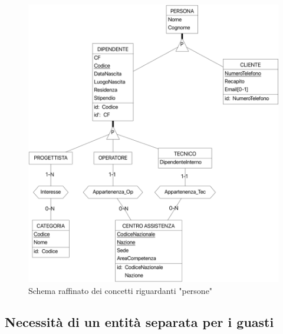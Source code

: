 \documentclass[a4paper, 12pt]{report}
\begin{document}
\begin{figure}[H]
	\centering
	\includegraphics[width=\linewidth]{images/persone.png}
	\caption{Schema raffinato dei concetti riguardanti "persone"}
\end{figure}

\subsection{Necessità di un entità separata per i guasti}
\end{document}

